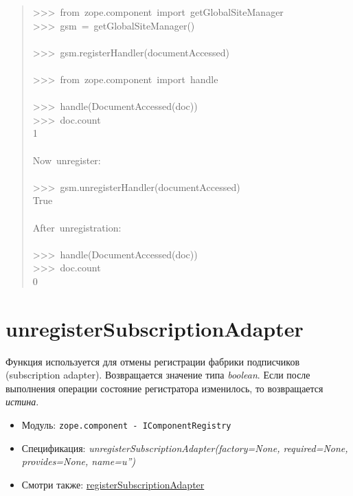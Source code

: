 \documentclass[a4paper,openany,twoside,final]{book}
\providecommand*{\DUroletitlereference}[1]{\textsl{#1}}
\begin{document}
\begin{quote}
{>{}>{}>~from~zope.component~import~getGlobalSiteManager\\
>{}>{}>~gsm~=~getGlobalSiteManager()\\
~\\
>{}>{}>~gsm.registerHandler(documentAccessed)\\
~\\
>{}>{}>~from~zope.component~import~handle\\
~\\
>{}>{}>~handle(DocumentAccessed(doc))\\
>{}>{}>~doc.count\\
1\\
~\\
Now~unregister:\\
~\\
>{}>{}>~gsm.unregisterHandler(documentAccessed)\\
True\\
~\\
After~unregistration:\\
~\\
>{}>{}>~handle(DocumentAccessed(doc))\\
>{}>{}>~doc.count\\
0
}
\end{quote}


\section*{unregisterSubscriptionAdapter%
  \label{unregistersubscriptionadapter}%
}

Функция используется для отмены регистрации фабрики подписчиков
(subscription adapter).  Возвращается значение типа \DUroletitlereference{boolean}. Если
после выполнения операции состояние регистратора изменилось, то
возвращается \DUroletitlereference{истина}.

\begin{itemize}

\item Модуль: \texttt{zope.component - IComponentRegistry}

\item Спецификация: \DUroletitlereference{unregisterSubscriptionAdapter(factory=None,
required=None, provides=None, name=u'')}

\item Смотри также: \hyperref[registersubscriptionadapter]{registerSubscriptionAdapter}

\end{itemize}
\end{document}
